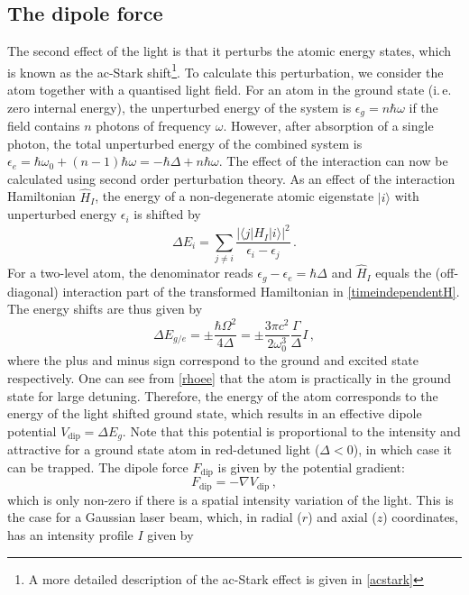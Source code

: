 \documentclass[../Thesis-IJspeert.tex]{subfiles}
\begin{document}
\subsection{The dipole force}
The second effect of the light is that it perturbs the atomic energy states, which is known as the ac-Stark shift\footnote{A more detailed description of the ac-Stark effect is given in \autoref{acstark}}. To calculate this perturbation, we consider the atom together with a quantised light field. For an atom in the ground state (i.\,e. zero internal energy), the unperturbed energy of the system is $\epsilon_g=n\hbar \omega$ if the field contains $n$ photons of frequency $\omega$. However, after absorption of a single photon, the total unperturbed energy of the combined system is $\epsilon_e=\hbar \omega_0+(n-1)\hbar\omega=-\hbar\Delta+n\hbar\omega$. The effect of the interaction can now be calculated using second order perturbation theory. As an effect of the interaction Hamiltonian $\hat{H}_I$, the energy of a non-degenerate atomic eigenstate $\vert i \rangle$ with unperturbed energy $\epsilon_i$ is shifted by
\begin{equation}
\Delta E_i=\sum_{j\neq i}\frac{\lvert \langle j \vert\hat{H}_I \vert i \rangle\rvert^2}{\epsilon_i-\epsilon_j}\,.
\end{equation}
For a two-level atom, the denominator reads $\epsilon_g - \epsilon_e = \hbar \Delta$ and $\hat{H}_I$ equals the (off-diagonal) interaction part of the transformed Hamiltonian in \autoref{timeindependentH}. The energy shifts are thus given by
\begin{equation}
\Delta E_{g/e}=\pm\frac{\hbar\Omega^2}{4\Delta}=\pm \frac{3\pi c^2}{2\omega_0^3}\frac{\Gamma}{\Delta}I\,,
\end{equation}
where the plus and minus sign correspond to the ground and excited state respectively. One can see from \autoref{rhoee} that the atom is practically in the ground state for large detuning. Therefore, the energy of the atom corresponds to the energy of the light shifted ground state, which results in an effective dipole potential $V_\text{dip} = \Delta E_g$. Note that this potential is proportional to the intensity and attractive for a ground state atom in red-detuned light ($\Delta<0$), in which case it can be trapped. The dipole force $F_\text{dip}$ is given by the potential gradient:
\begin{equation}
F_\text{dip}=-\nabla V_\text{dip}\,,
\end{equation}
which is only non-zero if there is a spatial intensity variation of the light. This is the case for a Gaussian laser beam, which, in radial ($r$) and axial ($z$) coordinates, has an intensity profile $I$ given by
\end{document}
